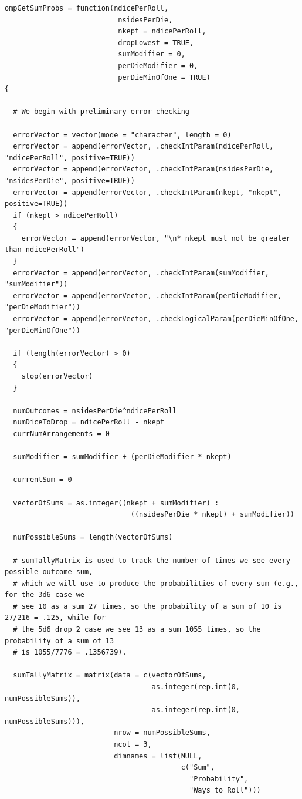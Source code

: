 \documentclass[12pt]{article}
\begin{document}
\begin{lstlisting}
ompGetSumProbs = function(ndicePerRoll,
                           nsidesPerDie,
                           nkept = ndicePerRoll,
                           dropLowest = TRUE,
                           sumModifier = 0,
                           perDieModifier = 0,
                           perDieMinOfOne = TRUE)
{
  
  # We begin with preliminary error-checking
  
  errorVector = vector(mode = "character", length = 0)
  errorVector = append(errorVector, .checkIntParam(ndicePerRoll, "ndicePerRoll", positive=TRUE))
  errorVector = append(errorVector, .checkIntParam(nsidesPerDie, "nsidesPerDie", positive=TRUE))
  errorVector = append(errorVector, .checkIntParam(nkept, "nkept", positive=TRUE))
  if (nkept > ndicePerRoll)
  {
    errorVector = append(errorVector, "\n* nkept must not be greater than ndicePerRoll")
  }
  errorVector = append(errorVector, .checkIntParam(sumModifier, "sumModifier"))
  errorVector = append(errorVector, .checkIntParam(perDieModifier, "perDieModifier"))
  errorVector = append(errorVector, .checkLogicalParam(perDieMinOfOne, "perDieMinOfOne"))
  
  if (length(errorVector) > 0)
  {
    stop(errorVector)
  }
  
  numOutcomes = nsidesPerDie^ndicePerRoll
  numDiceToDrop = ndicePerRoll - nkept
  currNumArrangements = 0
  
  sumModifier = sumModifier + (perDieModifier * nkept)
  
  currentSum = 0
  
  vectorOfSums = as.integer((nkept + sumModifier) :
                              ((nsidesPerDie * nkept) + sumModifier))
  
  numPossibleSums = length(vectorOfSums)
  
  # sumTallyMatrix is used to track the number of times we see every possible outcome sum,
  # which we will use to produce the probabilities of every sum (e.g., for the 3d6 case we 
  # see 10 as a sum 27 times, so the probability of a sum of 10 is 27/216 = .125, while for
  # the 5d6 drop 2 case we see 13 as a sum 1055 times, so the probability of a sum of 13
  # is 1055/7776 = .1356739).
  
  sumTallyMatrix = matrix(data = c(vectorOfSums,
                                   as.integer(rep.int(0, numPossibleSums)),
                                   as.integer(rep.int(0, numPossibleSums))),
                          nrow = numPossibleSums,
                          ncol = 3,
                          dimnames = list(NULL,
                                          c("Sum",
                                            "Probability",
                                            "Ways to Roll")))
  

\end{lstlisting}
\end{document}
